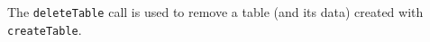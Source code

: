 The \verb+deleteTable+ call is used to remove a table (and its data) created with \verb+createTable+.
